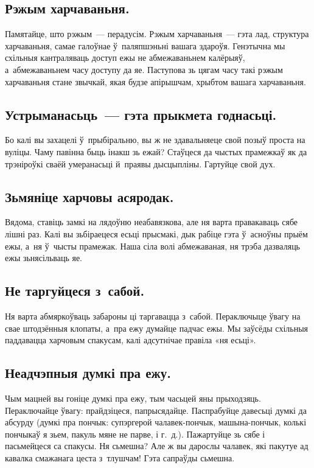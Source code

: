 \subsection{Рэжым харчаваньня.}

Памятайце, што рэжым~--- перадусім. Рэжым харчаваньня~--- гэта лад, структура харчаваньня, самае галоўнае ў~паляпшэньні вашага здароўя. Генэтычна мы схільныя кантраляваць доступ ежы не абмежаваньнем калёрыяў, а~абмежаваньнем часу доступу да яе. Паступова зь цягам часу такі рэжым харчаваньня стане звычкай, якая будзе апірышчам, хрыбтом вашага харчаваньня.

\subsection{Устрыманасьць~--- гэта прыкмета годнасьці.}
Бо калі вы захацелі ў~прыбіральню, вы ж не здавальняеце свой позыў проста на вуліцы. Чаму павінна быць інакш зь ежай? Стаўцеся да чыстых прамежкаў як да трэніроўкі сваёй умеранасьці й~праявы дысцыпліны. Гартуйце свой дух.

\subsection{Зьмяніце харчовы асяродак.} 
Вядома, ставіць замкі на лядоўню неабавязкова, але ня варта правакаваць сябе лішні раз. Калі вы зьбіраецеся есьці прысмакі, дык рабіце гэта ў~асноўны прыём ежы, а~ня ў~чысты прамежак. Наша сіла волі абмежаваная, ня трэба дазваляць ежы зьнясільваць яе.

\subsection{Не таргуйцеся з~сабой.} 
Ня варта абмяркоўваць забароны ці таргавацца з~сабой. Пераключыце ўвагу на свае штодзённыя клопаты, а~пра ежу думайце падчас ежы. Мы заўсёды схільныя паддавацца харчовым спакусам, калі адсутнічае правіла «ня есьці».


\subsection{Неадчэпныя думкі пра ежу.}
Чым мацней вы гоніце думкі пра ежу, тым часьцей яны прыходзяць. Пераключайце ўвагу: прайдзіцеся, папрысядайце. Паспрабуйце давесьці думкі да абсурду (думкі пра пончык: супэргерой чалавек-пончык, машына-пончык, колькі пончыкаў я зьем, пакуль мяне не парве, і г.~д.). Пажартуйце зь сябе і пасьмейцеся са спакусы. Ня сьмешна? Але ж вы дарослы чалавек, які пакутуе ад кавалка смажанага цеста з~тлушчам! Гэта сапраўды сьмешна.


